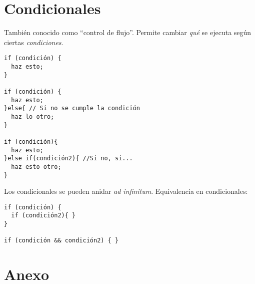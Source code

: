 \documentclass[10pt,twocolumn]{article}
\begin{document}
\section{Condicionales}
\label{sec:condicionales}

También conocido como ``control de flujo''. Permite cambiar \emph{qué} se ejecuta según ciertas \emph{condiciones}.

\begin{verbatim}
if (condición) {
  haz esto;
}

if (condición) {
  haz esto;
}else{ // Si no se cumple la condición
  haz lo otro;
}

if (condición){
  haz esto;
}else if(condición2){ //Si no, si...
  haz esto otro;
}
\end{verbatim}
Los condicionales se pueden anidar \emph{ad infinitum}.
Equivalencia en condicionales:

\begin{verbatim}
if (condición) {
  if (condición2){ }
}

if (condición && condición2) { }
\end{verbatim}

\section{Anexo}
\label{sec:anexo}
\end{document}
